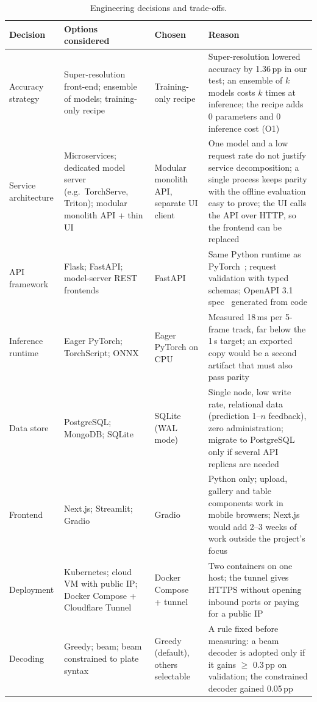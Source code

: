 \documentclass[11pt,a4paper]{article}
\newcommand{\pp}{\,pp}
\begin{document}
\begin{table}[H]
\centering\small
\caption{Engineering decisions and trade-offs.}\label{tab:tradeoffs}
\begin{tabularx}{\textwidth}{@{}P{2.3cm}P{3.6cm}P{2.3cm}L@{}}
\toprule
Decision & Options considered & Chosen & Reason \\
\midrule
Accuracy strategy & Super-resolution front-end; ensemble of models; training-only recipe & Training-only recipe & Super-resolution lowered accuracy by 1.36\pp{} in our test; an ensemble of $k$ models costs $k$ times at inference; the recipe adds 0 parameters and 0 inference cost (O1) \\
Service architecture & Microservices; dedicated model server (e.g.\ TorchServe, Triton); modular monolith API + thin UI & Modular monolith API, separate UI client & One model and a low request rate do not justify service decomposition; a single process keeps parity with the offline evaluation easy to prove; the UI calls the API over HTTP, so the frontend can be replaced \\
API framework & Flask; FastAPI; model-server REST frontends & FastAPI~\cite{fastapi} & Same Python runtime as PyTorch~\cite{paszke2019pytorch}; request validation with typed schemas; OpenAPI 3.1 spec~\cite{openapi} generated from code \\
Inference runtime & Eager PyTorch; TorchScript; ONNX & Eager PyTorch on CPU & Measured 18\,ms per 5-frame track, far below the 1\,s target; an exported copy would be a second artifact that must also pass parity \\
Data store & PostgreSQL; MongoDB; SQLite & SQLite (WAL mode) & Single node, low write rate, relational data (prediction 1--$n$ feedback), zero administration; migrate to PostgreSQL only if several API replicas are needed \\
Frontend & Next.js; Streamlit; Gradio~\cite{abid2019gradio} & Gradio & Python only; upload, gallery and table components work in mobile browsers; Next.js would add 2--3 weeks of work outside the project's focus \\
Deployment & Kubernetes; cloud VM with public IP; Docker Compose + Cloudflare Tunnel & Docker Compose~\cite{dockercompose} + tunnel~\cite{cloudflaretunnel} & Two containers on one host; the tunnel gives HTTPS without opening inbound ports or paying for a public IP \\
Decoding & Greedy; beam; beam constrained to plate syntax & Greedy (default), others selectable & A rule fixed before measuring: a beam decoder is adopted only if it gains $\geq$ 0.3\pp{} on validation; the constrained decoder gained 0.05\pp \\
\bottomrule
\end{tabularx}
\end{table}
\end{document}
